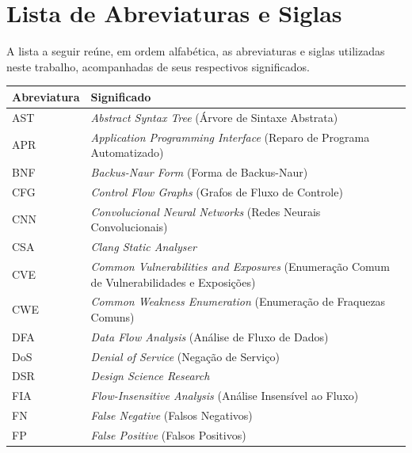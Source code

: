 \documentclass[
    12pt,                %
    openright,           %
    oneside,             %
    a4paper,             %
    english,             %
    brazil               %
]{abntex2}
\begin{document}
\chapter*{Lista de Abreviaturas e Siglas}

\noindent A lista a seguir reúne, em ordem alfabética, as abreviaturas e siglas utilizadas neste trabalho, acompanhadas de seus respectivos significados.

\vspace{\onelineskip}
\begin{center}
\begin{tabular}{@{}p{3.2cm}p{}@{}}
\toprule
\textbf{Abreviatura} & \textbf{Significado} \\
\midrule
AST  & \textit{Abstract Syntax Tree} (Árvore de Sintaxe Abstrata) \\
APR  & \textit{Application Programming Interface} (Reparo de Programa Automatizado) \\
BNF  & \textit{Backus-Naur Form} (Forma de Backus-Naur) \\
CFG  & \textit{Control Flow Graphs} (Grafos de Fluxo de Controle) \\
CNN  & \textit{Convolucional Neural Networks} (Redes Neurais Convolucionais) \\
CSA  & \textit{Clang Static Analyser} \\
CVE  & \textit{Common Vulnerabilities and Exposures} (Enumeração Comum de Vulnerabilidades e Exposições)  \\
CWE  & \textit{Common Weakness Enumeration} (Enumeração de Fraquezas Comuns) \\
DFA  & \textit{Data Flow Analysis} (Análise de Fluxo de Dados) \\
DoS  & \textit{Denial of Service} (Negação de Serviço) \\
DSR  & \textit{Design Science Research} \\ 
FIA  & \textit{Flow-Insensitive Analysis} (Análise Insensível ao Fluxo) \\
FN   & \textit{False Negative} (Falsos Negativos) \\
FP   & \textit{False Positive} (Falsos Positivos) \\
\bottomrule
\end{tabular}
\end{center}
\end{document}
